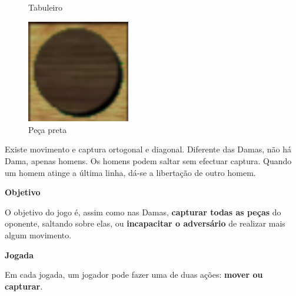 \documentclass[a4paper]{article}
\begin{document}
\begin{small}
\begin{figure}[h!]
\begin{minipage}[h!]{0.2\textwidth}
    \caption{Tabuleiro}
    \label{fig:3}
  \end{minipage}
	\quad\quad\quad
  \begin{minipage}[h!]{0.2\textwidth}
    \includegraphics[width=0.4\textwidth]{res/black_piece.png}
	\centering
    \caption{Peça preta}
    \label{fig:4}
  \end{minipage}
\end{figure}

Existe movimento e captura ortogonal e diagonal. Diferente das Damas, não há Dama, apenas homens. Os homens podem saltar sem efectuar captura. Quando um homem atinge a última linha, dá-se a libertação de outro homem.
\end{small}\newline

\large{\textbf{Objetivo}}
\begin{small}

O objetivo do jogo é, assim como nas Damas, \textbf{capturar todas as peças} do oponente, saltando sobre elas, ou \textbf{incapacitar o adversário} de realizar mais algum movimento.
\end{small}\newline

\large{\textbf{Jogada}}
\begin{small}

Em cada jogada, um jogador pode fazer uma de duas ações: \textbf{mover ou capturar}.
\end{small}\newline
\end{document}
